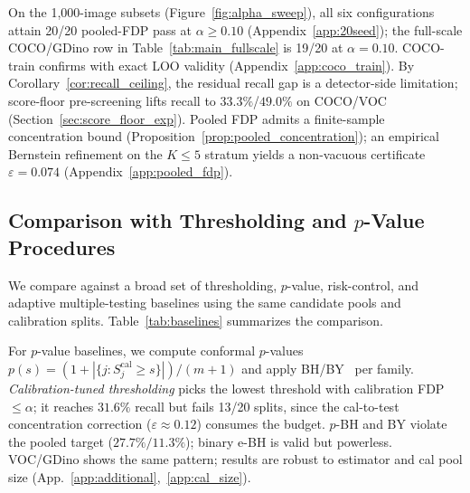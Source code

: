 \documentclass{article}
\theoremstyle{remark}
\newcommand{\1}{\mathbf{1}}
\begin{document}
On the 1{,}000-image subsets (Figure~\ref{fig:alpha_sweep}), all
six configurations attain 20/20 pooled-FDP pass at
$\alpha\!\ge\!0.10$ (Appendix~\ref{app:20seed}); the full-scale
COCO/GDino row in Table~\ref{tab:main_fullscale} is 19/20 at
$\alpha\!=\!0.10$. COCO-train confirms with exact LOO validity
(Appendix~\ref{app:coco_train}). By
Corollary~\ref{cor:recall_ceiling}, the residual recall gap is a
detector-side limitation; score-floor pre-screening lifts recall to
$33.3\%$/$49.0\%$ on COCO/VOC
(Section~\ref{sec:score_floor_exp}). Pooled FDP admits a finite-sample concentration bound
(Proposition~\ref{prop:pooled_concentration}); an empirical Bernstein
refinement on the $K\!\le\!5$ stratum yields a non-vacuous certificate
$\varepsilon\!=\!0.074$ (Appendix~\ref{app:pooled_fdp}).

\subsection{Comparison with Thresholding and $p$-Value Procedures}

We compare against a broad set of thresholding, $p$-value,
risk-control, and adaptive multiple-testing baselines using the same
candidate pools and calibration splits. Table~\ref{tab:baselines}
summarizes the comparison.

For $p$-value baselines, we compute conformal $p$-values
$p(s)\!=\!(1+|\{j:S_j^{\mathrm{cal}}\!\ge\!s\}|)/(m{+}1)$ and apply
BH/BY~\cite{benjamini1995controlling,benjamini2001control} per family.
\emph{Calibration-tuned thresholding} picks the lowest threshold with
calibration FDP $\le\alpha$; it reaches $31.6\%$ recall but fails 13/20
splits, since the cal-to-test concentration correction
($\varepsilon\!\approx\!0.12$) consumes the budget. $p$-BH and BY
violate the pooled target ($27.7\%/11.3\%$); binary e-BH is valid but
powerless. VOC/GDino shows the same pattern; results are robust to
estimator and cal pool size (App.~\ref{app:additional},~\ref{app:cal_size}).
\end{document}
